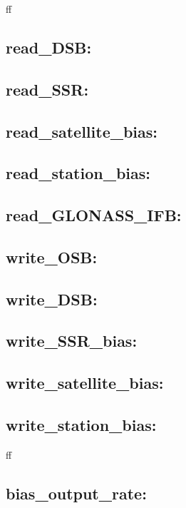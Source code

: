 ff
\subsection{read\_DSB:}

\subsection{read\_SSR:}

\subsection{read\_satellite\_bias:}

\subsection{read\_station\_bias:}

\subsection{read\_GLONASS\_IFB:}

\subsection{write\_OSB:}

\subsection{write\_DSB:}

\subsection{write\_SSR\_bias:}

\subsection{write\_satellite\_bias:}

\subsection{write\_station\_bias:}
ff
\subsection{bias\_output\_rate:}








